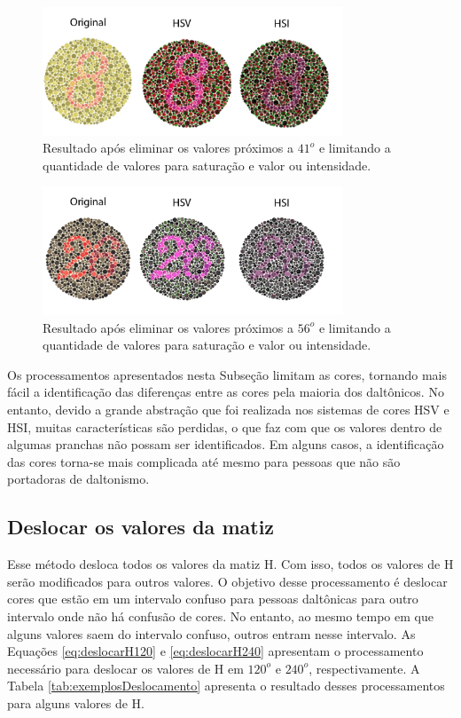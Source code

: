 \documentclass[	12pt, Times, openright, twoside, a4paper, english, brazil]{abntex2}
\begin{document}
\begin{figure}[!htb]
\centering \includegraphics[width=0.8\textwidth]{figuraHistograma2.png}
\caption{Resultado após eliminar os valores próximos a $41^o$ e limitando a quantidade de valores para saturação e valor ou intensidade.} \label{fig:figuraHistogramaHSV2}
\end{figure}

\begin{figure}[!htb]
\centering \includegraphics[width=0.8\textwidth]{figuraHistograma3.png}
\caption{Resultado após eliminar os valores próximos a $56^o$ e limitando a quantidade de valores para saturação e valor ou intensidade.} \label{fig:figuraHistogramaHSV3}
\end{figure}

Os processamentos apresentados nesta Subseção limitam as cores, tornando mais fácil a identificação das diferenças entre as cores pela maioria dos daltônicos. No entanto, devido a grande abstração que foi realizada nos sistemas de cores HSV e HSI, muitas características são perdidas, o que faz com que os valores dentro de algumas pranchas não possam ser identificados. Em alguns casos, a identificação das cores torna-se mais complicada até mesmo para pessoas que não são portadoras de daltonismo.

\subsection{Deslocar os valores da matiz}
\label{subsec:deslocarMatiz}

Esse método desloca todos os valores da matiz H. Com isso, todos os valores de H serão modificados para outros valores. O objetivo desse processamento é deslocar cores que estão em um intervalo confuso para pessoas daltônicas para outro intervalo onde não há confusão de cores. No entanto, ao mesmo tempo em que alguns valores saem do intervalo confuso, outros entram nesse intervalo. As Equações \ref{eq:deslocarH120} e \ref{eq:deslocarH240} apresentam o processamento necessário para deslocar os valores de H em $120^o$ e $240^o$, respectivamente. A Tabela \ref{tab:exemplosDeslocamento} apresenta o resultado desses processamentos para alguns valores de H.
\end{document}
